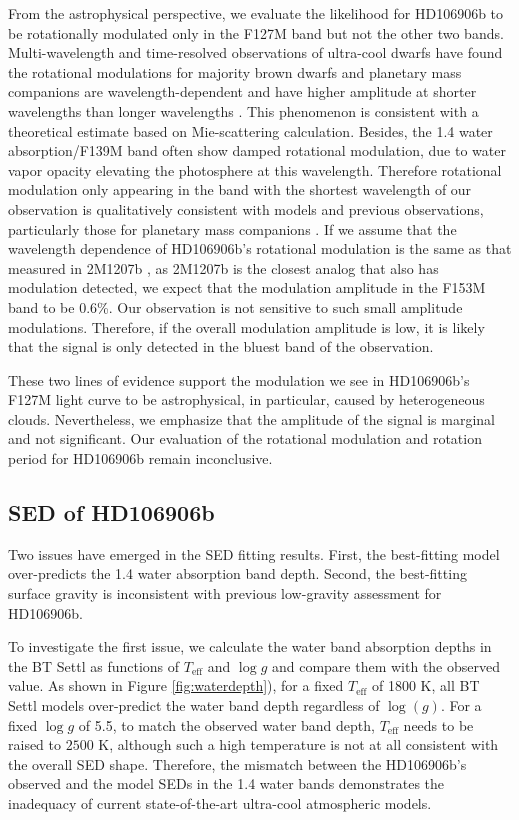\documentclass[twocolumn]{aastex62}
\newcommand{\logg}{\ensuremath{\log(g)}\xspace}
\begin{document}
From the astrophysical perspective, we evaluate the likelihood for HD106906b to be rotationally modulated only in the F127M band but not the other two bands. Multi-wavelength and time-resolved observations of ultra-cool dwarfs have found the rotational modulations for majority  brown dwarfs and planetary mass companions are wavelength-dependent and have higher amplitude at shorter wavelengths than longer wavelengths \citep[e.g.,][]{Zhou2019,Zhou2016,Yang2014,Apai2013,Schlawin}. This phenomenon is consistent with a theoretical estimate based on Mie-scattering calculation\citep{Schlawin,Hiranaka2016}. Besides, the 1.4 \micron{} water absorption/F139M band often show damped rotational modulation, due to water vapor opacity elevating the photosphere at this wavelength.  Therefore rotational modulation only appearing in the band with the shortest wavelength of our observation is qualitatively consistent with models and previous observations, particularly those for planetary mass companions \citep{Zhou2016,Zhou2019}. If we assume that the wavelength dependence of HD106906b's rotational modulation is the same as that measured in 2M1207b \citep{Zhou2016}, as 2M1207b is the closest analog that also has modulation detected, we expect that the modulation amplitude in the F153M band to be 0.6\%. Our observation is not sensitive to such small amplitude modulations. Therefore, if the overall modulation amplitude is low, it is likely that the signal is only detected in the bluest band of the observation.

These two lines of evidence support the modulation we see in HD106906b's F127M light curve to be astrophysical, in particular, caused by heterogeneous clouds. Nevertheless, we emphasize that the amplitude of the signal is marginal and not significant. Our evaluation of the rotational modulation and rotation period for HD106906b remain inconclusive.


\subsection{SED of  HD106906b}
Two issues have emerged in the SED fitting results. First, the best-fitting model over-predicts the 1.4 \micron{} water absorption band depth. Second, the best-fitting surface gravity is inconsistent with previous low-gravity assessment for HD106906b.

To investigate the first issue, we calculate the water band absorption depths in the BT Settl as functions of $T_{\mathrm{eff}}$ and $\log g$ and compare them with the observed value. As shown in Figure \ref{fig:waterdepth}), for a fixed $T_{\mathrm{eff}}$ of 1800 K, all BT Settl models over-predict the water band depth regardless of \logg. For a fixed $\log g$ of 5.5, to match the observed water band depth, $T_{\mathrm{eff}}$ needs to be raised to $2500$ K, although such a high temperature is not at all consistent with the overall SED shape. Therefore, the mismatch between the HD106906b's observed and the model SEDs in the 1.4 \micron{} water bands demonstrates the inadequacy of current state-of-the-art ultra-cool atmospheric models.
\end{document}
